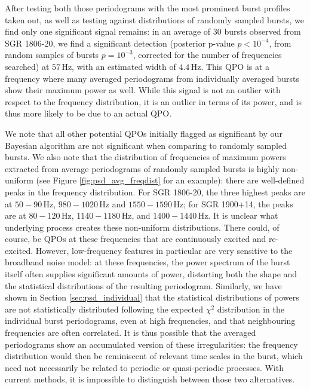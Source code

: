\documentclass[numberedappendix]{emulateapj}
\newcommand{\hz}{\,\mathrm{Hz}}
\begin{document}
After testing both those periodograms with the most prominent burst profiles taken out, as well as testing against distributions of randomly sampled bursts, we find only one significant signal remains: in an average of $30$ bursts observed from SGR 1806-20, we find a significant detection (posterior p-value $p < 10^{-4}$, from random samples of bursts $p = 10^{-3}$, corrected for the number of frequencies searched) at $57 \hz$, with an estimated width of $4.4 \hz$. This QPO is at a frequency where many averaged periodograms from individually averaged bursts show their maximum power as well. While this signal is not an outlier with respect to the frequency distribution, it is an outlier in terms of its power, and is thus more likely to be due to an actual QPO.


We note that all other potential QPOs initially flagged as significant by our Bayesian algorithm are not significant when comparing to randomly sampled bursts. We also note that the distribution of frequencies of maximum powers extracted from average periodograms of randomly sampled bursts is highly non-uniform (see Figure \ref{fig:psd_avg_freqdist} for an example): there are well-defined peaks in the frequency distribution. For SGR 1806-20, the three highest peaks are at $50 - 90 \hz$, $980 - 1020 \hz$ and $1550 - 1590 \hz$; for SGR 1900+14, the peaks are at $80 - 120 \hz$, $1140 - 1180 \hz$, and $1400 - 1440 \hz$. It is unclear what underlying process creates these non-uniform distributions. There could, of course, be QPOs at these frequencies that are continuously excited and re-excited. However, low-frequency features in particular are very sensitive to the broadband noise model: at these frequencies, the power spectrum of the burst itself often supplies significant amounts of power, distorting both the shape and the statistical distributions of the resulting periodogram. Similarly, we have shown in Section \ref{sec:psd_individual} that the statistical distributions of powers are not statistically distributed following the expected $\chi^2$ distribution in the individual burst periodograms, even at high frequencies, and that neighbouring frequencies are often correlated. It is thus possible that the averaged periodograms show an accumulated version of these irregularities: the frequency distribution would then be reminiscent of relevant time scales in the burst, which need not necessarily be related to periodic or quasi-periodic processes. With current methods, it is impossible to distinguish between those two alternatives.
\end{document}
